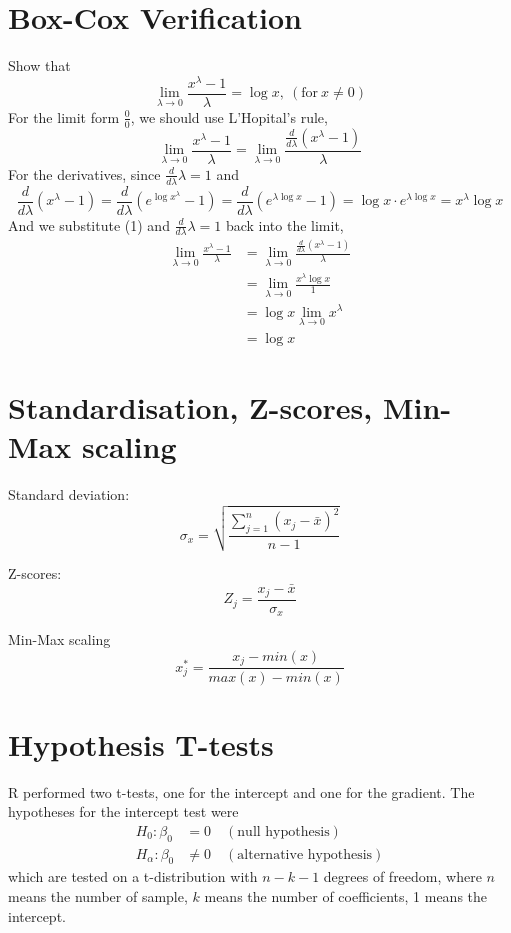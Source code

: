 \documentclass{article} %
\begin{document}

\section*{Box-Cox Verification}
Show that
$$
\lim_{\lambda \to 0} \frac{x^\lambda - 1}{\lambda} = \log x,\ (\text{for} \ x \neq 0)
$$
For the limit form $\frac{0}{0}$, we should use L'Hopital's rule,
\[
    \lim_{\lambda \to 0}\frac{x^{\lambda} - 1}{\lambda} 
    = 
    \lim_{\lambda \to 0}\frac{\frac{d}{d\lambda}(x^{\lambda} - 1)}{\lambda}
\]
For the derivatives, since $\frac{d}{d\lambda}\lambda=1$ and
\begin{equation}
    \frac{d}{d\lambda}(x^{\lambda} - 1) 
    = \frac{d}{d\lambda}(e^{\log x^{\lambda}} - 1) 
    = \frac{d}{d\lambda}(e^{\lambda \log x} - 1) 
    = \log x \cdot e^{\lambda \log x} 
    = x^{\lambda} \log x
\end{equation}
And we substitute (1) and $\frac{d}{d\lambda}\lambda=1$ back into the limit,
$$
\begin{aligned}
    \lim_{\lambda \to 0}\frac{x^{\lambda} - 1}{\lambda} 
    &= \lim_{\lambda \to 0}\frac{\frac{d}{d\lambda}(x^{\lambda} - 1)}{\lambda} \\
    &= \lim_{\lambda \to 0}\frac{x^{\lambda} \log x}{1} \\
    &= \log x \lim_{\lambda \to 0}x^{\lambda} \\
    &= \log x
\end{aligned}
$$

\section*{Standardisation, Z-scores, Min-Max scaling}
Standard deviation: 
$$
\sigma_x = \sqrt{\frac{\sum_{j=1}^{n}(x_j-\bar{x})^2}{n-1}}
$$

Z-scores: 
$$
Z_j = \frac{x_j - \bar{x}}{\sigma_x}
$$

Min-Max scaling
$$
x^*_j = \frac{x_j - min(x)}{max(x) - min(x)}
$$

\section*{Hypothesis T-tests}
R performed two t-tests, one for the intercept and one for the gradient. The hypotheses for the intercept test were
$$
\begin{aligned}
    H_0: \beta_0 &= 0 \quad (\text{null hypothesis}) \\
    H_\alpha: \beta_0 &\neq 0 \quad (\text{alternative hypothesis})
\end{aligned}
$$
which are tested on a t-distribution with $n-k-1$ degrees of freedom, where $n$ means the number of sample, $k$ means the number of coefficients, 1 means the intercept.
\end{document}
